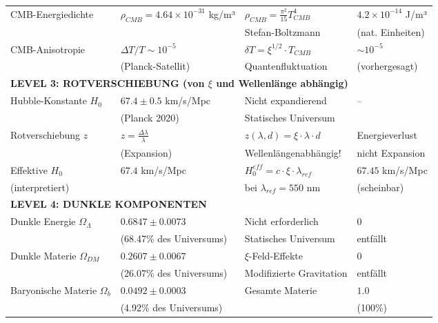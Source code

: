 \documentclass[12pt,a4paper]{article}
\begin{document}
\begin{longtable}{p{4.5cm}p{3.5cm}p{3.5cm}p{3.5cm}}
		CMB-Energiedichte & $\rho_{CMB} = 4.64 \times 10^{-31}$ kg/m³ & $\rho_{CMB} = \frac{\pi^2}{15} T_{CMB}^4$ & $4.2 \times 10^{-14}$ J/m³ \\
		& & Stefan-Boltzmann & (nat. Einheiten) \\[0.3em]
		
		CMB-Anisotropie & $\Delta T/T \sim 10^{-5}$ & $\delta T = \xi^{1/2} \cdot T_{CMB}$ & $\sim 10^{-5}$ \\
		& (Planck-Satellit) & Quantenfluktuation & (vorhergesagt) \\[0.3em]
		
		\midrule
		\multicolumn{4}{l}{\textbf{LEVEL 3: ROTVERSCHIEBUNG (von $\xi$ und Wellenlänge abhängig)}} \\
		\midrule
		
		Hubble-Konstante $H_0$ & $67.4 \pm 0.5$ km/s/Mpc & Nicht expandierend & -- \\
		& (Planck 2020) & Statisches Universum & \\[0.3em]
		
		Rotverschiebung $z$ & $z = \frac{\Delta\lambda}{\lambda}$ & $z(\lambda, d) = \xi \cdot \lambda \cdot d$ & Energieverlust \\
		& (Expansion) & Wellenlängenabhängig! & nicht Expansion \\[0.3em]
		
		Effektive $H_0$ & $67.4$ km/s/Mpc & $H_0^{eff} = c \cdot \xi \cdot \lambda_{ref}$ & $67.45$ km/s/Mpc \\
		(interpretiert) & & bei $\lambda_{ref} = 550$ nm & (scheinbar) \\[0.3em]
		
		\midrule
		\multicolumn{4}{l}{\textbf{LEVEL 4: DUNKLE KOMPONENTEN}} \\
		\midrule
		
		Dunkle Energie $\Omega_\Lambda$ & $0.6847 \pm 0.0073$ & Nicht erforderlich & $0$ \\
		& (68.47\% des Universums) & Statisches Universum & entfällt \\[0.3em]
		
		Dunkle Materie $\Omega_{DM}$ & $0.2607 \pm 0.0067$ & $\xi$-Feld-Effekte & $0$ \\
		& (26.07\% des Universums) & Modifizierte Gravitation & entfällt \\[0.3em]
		
		Baryonische Materie $\Omega_b$ & $0.0492 \pm 0.0003$ & Gesamte Materie & $1.0$ \\
		& (4.92\% des Universums) & & (100\%) \\[0.3em]
		

\end{longtable}
\end{document}

